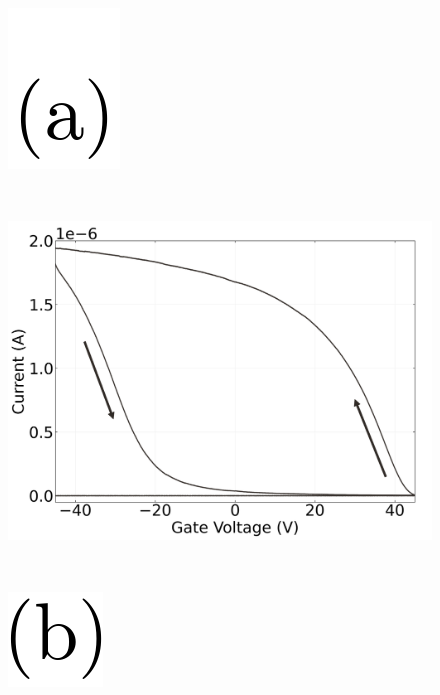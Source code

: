 \documentclass[
  letterpaper,
  DIV=11,
  numbers=noendperiod]{scrartcl}
\begin{document}
\begin{figure}

\begin{minipage}{0.03\linewidth}
\includegraphics{figures/(a).png}\end{minipage}%
%
\begin{minipage}{0.01\linewidth}
~\end{minipage}%
%
\begin{minipage}{0.45\linewidth}
\includegraphics{figures/ch2/Q5C10_hysteresis.png}\end{minipage}%
%
\begin{minipage}{0.01\linewidth}
~\end{minipage}%
%
\begin{minipage}{0.03\linewidth}
\includegraphics{figures/(b).png}\end{minipage}%
%
\begin{minipage}{0.01\linewidth}

\end{minipage}
\end{figure}
\end{document}
